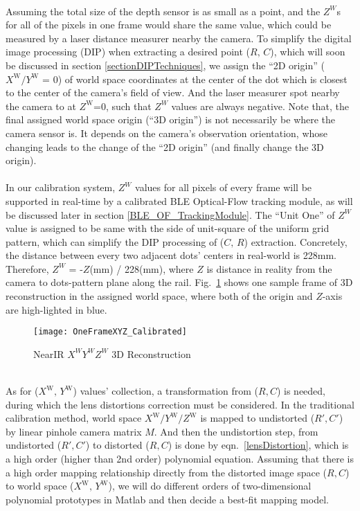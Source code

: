 \\\indent%
Assuming the total size of the depth sensor is as small as a point, and the \(Z^W\)s for all of the pixels in one frame would share the same value, which could be measured by a laser distance measurer nearby the camera. To simplify the digital image processing (DIP) when extracting a desired point (\(R,\, C\)), which will soon be discussed in section \ref{sectionDIPTechniques}, we assign the \enquote{2D origin} (\(X^\text{W}/Y^\text{W}\) = 0) of world space coordinates at the center of the dot which is closest to the center of the camera's field of view. And the laser measurer spot nearby the camera to at \(Z^\text{W}\)=0, such that \(Z^{W}\) values are always negative. Note that, the final assigned world space origin (\enquote{3D origin}) is not necessarily be where the camera sensor is. It depends on the camera's observation orientation, whose changing leads to the change of the \enquote{2D origin} (and finally change the 3D origin).
\\\\\indent
In our calibration system, \(Z^{W}\) values for all pixels of every frame will be supported in real-time by a calibrated BLE Optical-Flow tracking module, as will be discussed later in section \ref{BLE_OF_TrackingModule}. The \enquote{Unit One} of \(Z^{W}\) value is assigned to be same with the side of unit-square of the uniform grid pattern, which can simplify the DIP processing of (\(C, \, R\)) extraction. Concretely, the distance between every two adjacent dots' centers in real-world is 228mm. Therefore, \(Z^{W}\) = -\(Z\)(mm) / 228(mm), where \(Z\) is distance in reality from the camera to dots-pattern plane along the rail. Fig.~\ref{OneFrameXYZ_Calibrated} shows one sample frame of 3D reconstruction in the assigned world space, where both of the origin and \(Z\)-axis are high-lighted in blue.
%
\begin{figure}[!t]
\centering
\texttt{[image: OneFrameXYZ\_Calibrated]}
\caption{NearIR \(X^{W}Y^{W}Z^{W}\) 3D Reconstruction}
\label{OneFrameXYZ_Calibrated}
\end{figure}%
%
\\\indent
As for (\(X^\text{W}, \, Y^\text{W}\)) values' collection, a transformation from (\(R, C\)) is needed, during which the lens distortions correction must be considered. In the traditional calibration method, world space \(X^\text{W}/Y^\text{W}/Z^\text{W}\) is mapped to undistorted (\(R', C'\)) by linear pinhole camera matrix \(M\). And then the undistortion step, from undistorted (\(R', C'\)) to distorted (\(R, C\)) is done by eqn.~\ref{lensDistortion}, which is a high order (higher than 2nd order) polynomial equation. Assuming that there is a high order mapping relationship directly from the distorted image space (\(R, C\)) to world space (\(X^\text{W}, \, Y^\text{W}\)), we will do different orders of two-dimensional polynomial prototypes in Matlab and then decide a best-fit mapping model.
